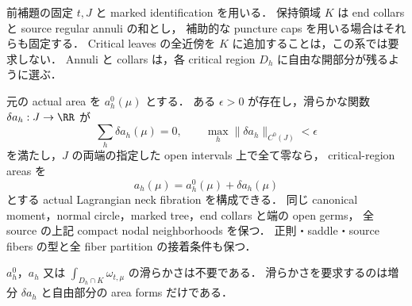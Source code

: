 \begin{corollary}
\label{ng8:p0-small-area-flexibility}
前補題の固定 $t,J$ と marked identification を用いる．
保持領域 $K$ は end collars と source regular annuli の和とし，
補助的な puncture caps を用いる場合はそれらも固定する．
Critical leaves の全近傍を $K$ に追加することは，この系では要求しない．
Annuli と collars は，各 critical region $D_h$ に自由な開部分が残るように選ぶ．

元の actual area を $a_h^0(\mu)$ とする．
ある $\epsilon>0$ が存在し，滑らかな関数 $\delta a_h:J\to\RR$ が
\begin{equation}\label{ng8:eq:p0-small-area-increments}
 \sum_h\delta a_h(\mu)=0,\qquad
 \max_h\|\delta a_h\|_{C^0(J)}<\epsilon
\end{equation}
を満たし，$J$ の両端の指定した open intervals 上で全て零なら，
critical-region areas を
\[
 a_h(\mu)=a_h^0(\mu)+\delta a_h(\mu)
\]
とする actual Lagrangian neck fibration を構成できる．
同じ canonical moment，normal circle，marked tree，end collars と端の open germs，
全 source の上記 compact nodal neighborhoods を保つ．
正則・saddle・source fibers の型と全 fiber partition の接着条件も保つ．

$a_h^0$，$a_h$ 又は $\int_{D_h\cap K}\omega_{t,\mu}$ の滑らかさは不要である．
滑らかさを要求するのは増分 $\delta a_h$ と自由部分の area forms だけである．
\end{corollary}

